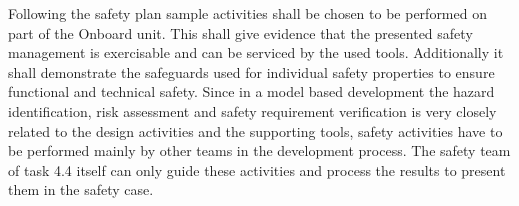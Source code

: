 Following the safety plan sample activities shall be chosen to be performed on part of the Onboard unit. This shall give evidence that the presented safety management is exercisable and can be serviced by the used tools. Additionally it shall demonstrate the safeguards used for individual safety properties to ensure functional and technical safety. 
Since in a model based development the hazard identification, risk assessment and safety requirement verification is very closely related to the design activities and the supporting tools, safety activities have to be performed mainly by other teams in the development process. The safety team of task 4.4 itself can only guide these activities and process the results to present them in the safety case. 






